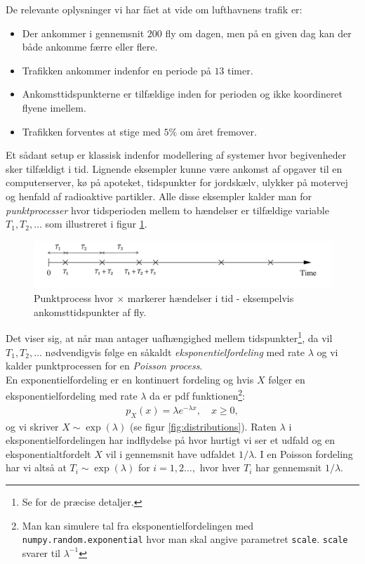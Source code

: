 De relevante oplysninger vi har fået at vide om lufthavnens trafik er:
\begin{itemize}
\item Der ankommer i gennemsnit $200$ fly om dagen, men på en given dag kan der både ankomme færre eller flere.
\item Trafikken ankommer indenfor en periode på $13$ timer. 
\item Ankomsttidspunkterne er tilfældige inden for perioden og ikke koordineret flyene imellem. 
\item Trafikken forventes at stige med $5\%$ om året fremover. 
\end{itemize}
Et sådant setup er klassisk indenfor modellering af systemer hvor begivenheder sker tilfældigt i tid. Lignende eksempler kunne være ankomst af opgaver til en computerserver, kø på apoteket, tidspunkter for jordskælv, ulykker på motervej og henfald af radioaktive partikler. Alle disse eksempler kalder man for \textit{punktprocesser} hvor tidsperioden mellem to hændelser er tilfældige variable $T_1, T_2,\dots$ som illustreret i figur \ref{fig:process1}. 
\begin{figure}
\centering
\includegraphics[width = \textwidth]{process1.png}
\caption{Punktprocess hvor $\times$ markerer hændelser i tid - eksempelvis ankomsttidspunkter af fly.} \label{fig:process1}
\end{figure}
Det viser sig, at når man antager uafhængighed mellem tidspunkter\footnote{Se \cite[123-127]{olofsson2012} for de præcise detaljer.}, da vil $T_1, T_2,\dots$ nødvendigvis følge en såkaldt \textit{eksponentielfordeling} med rate $\lambda$ og vi kalder punktprocessen for en \textit{Poisson process}. \\
En exponentielfordeling er en kontinuert fordeling og hvis $X$ følger en eksponentielfordeling med rate $\lambda$ da er pdf funktionen\footnote{Man kan simulere tal fra eksponentielfordelingen med \texttt{numpy.random.exponential} hvor man skal angive parametret \texttt{scale}. \texttt{scale} svarer til $\lambda^{-1}$}:
\begin{align*}
p_X(x) = \lambda e^{-\lambda x}, \quad x \geq 0,
\end{align*}
og vi skriver $X \sim \exp(\lambda)$ (se figur \ref{fig:distributions}). Raten $\lambda$ i eksponentielfordelingen har indflydelse på hvor hurtigt vi ser et udfald og en eksponentialtfordelt $X$ vil i gennemsnit have udfaldet $1/\lambda$. I en Poisson fordeling har vi altså at $T_i \sim \exp(\lambda)$ for $i = 1,2\dots,$ hvor hver $T_i$ har gennemsnit $1/\lambda$.
